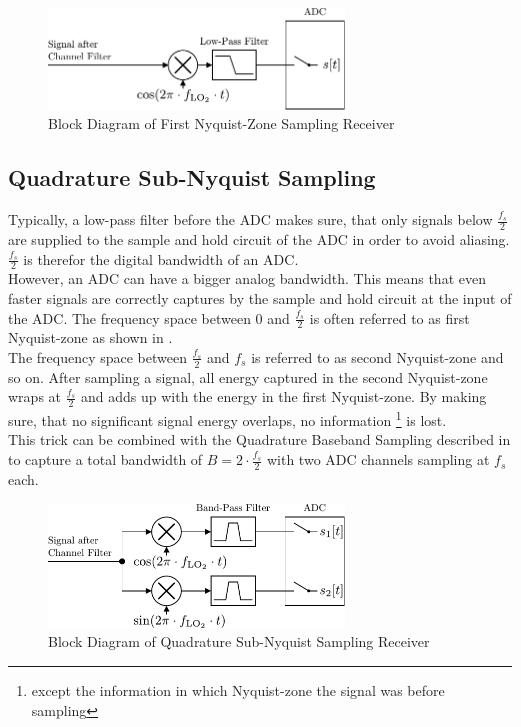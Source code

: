 \begin{figure}[h!]
  \centering
  \includegraphics[width=0.7\textwidth]{figures/rx_adc_0_bd}
  \caption{Block Diagram of First Nyquist-Zone Sampling Receiver}
  \label{fig:rx_adc_0_bd}
\end{figure}

\subsection{Quadrature Sub-Nyquist Sampling}
\label{sec:rx_adc_2}
Typically, a low-pass filter before the \gls{ADC} makes sure, that only
signals below $\frac{f_s}{2}$ are supplied to the sample and hold circuit
of the \gls{ADC} in order to avoid aliasing.
$\frac{f_s}{2}$ is therefor the digital bandwidth of an \gls{ADC}. \\

However, an \gls{ADC} can have a bigger analog bandwidth. This means that
even faster signals are correctly captures by the sample and hold circuit
at the input of the \gls{ADC}. The frequency space between 0 and
$\frac{f_s}{2}$ is often referred to as first Nyquist-zone as shown in
. \\
The frequency space between $\frac{f_s}{2}$ and $f_s$ is referred to as
second Nyquist-zone and so on. After sampling a signal, all energy captured
in the second Nyquist-zone wraps at $\frac{f_s}{2}$ and adds up with the energy
in the first Nyquist-zone.
By making sure, that no significant signal energy overlaps, no information%
\footnote{except the information in which Nyquist-zone the signal was before
  sampling} is lost. \\

This trick can be combined with the Quadrature Baseband Sampling described
in  to capture a total bandwidth of
$B = 2 \cdot \frac{f_s}{2}$ with two \gls{ADC} channels sampling at $f_s$ each. \\

\begin{figure}[h!]
  \centering
  \includegraphics[width=0.7\textwidth]{figures/rx_adc_2_bd}
  \caption{Block Diagram of Quadrature Sub-Nyquist Sampling Receiver}
  \label{fig:rx_adc_2_bd}
\end{figure}

